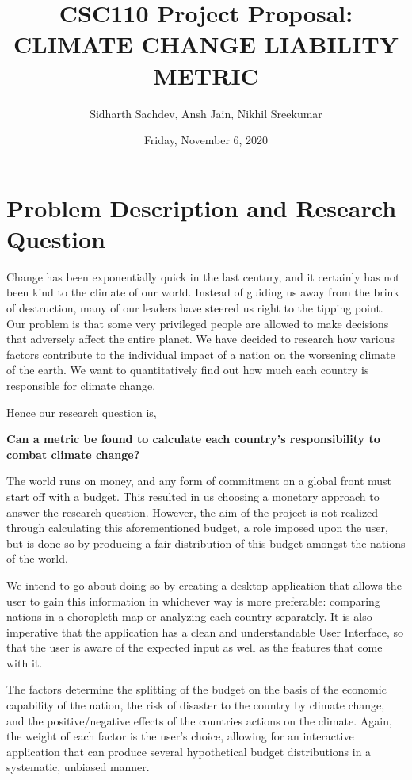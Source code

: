 \documentclass[fontsize=11pt]{article}
\title{CSC110 Project Proposal: CLIMATE CHANGE LIABILITY METRIC}
\author{Sidharth Sachdev, Ansh Jain, Nikhil Sreekumar}
\date{Friday, November 6, 2020}
\begin{document}
\maketitle

\section*{Problem Description and Research Question}

Change has been exponentially quick in the last century, and it certainly has not been kind to the climate of our world.
Instead of guiding us away from the brink of destruction, many of our leaders have steered us right to the tipping point.
Our problem is that some very privileged people are allowed to make decisions that adversely affect the entire planet.
 We have decided to research how various factors contribute to the individual impact of a nation on the worsening climate of the earth.
We want to quantitatively find out how much each country is responsible for climate change.\newline

Hence our research question is,\newline

\textbf{Can a metric be found to calculate each country's responsibility to combat climate change?} \newline

The world runs on money, and any form of commitment on a global front must start off with
a budget.
This resulted in us choosing a monetary approach to answer the research question.
However, the aim of the project is not realized through calculating this aforementioned budget, a role
imposed upon the user, but is done so by producing a fair distribution
of this budget amongst the nations of the world.\newline

We intend to go about doing so by creating a desktop application that allows the user to gain this information in
whichever way is more preferable: comparing nations in a choropleth map or analyzing each country separately.
It is also imperative that the application has a clean and understandable User Interface, so that the user is aware
of the expected input as well as the features that come with it.\newline

The factors determine the splitting of the budget on the basis of the economic capability of the nation, the risk of disaster to the
country by climate change, and the positive/negative effects of the countries actions on the climate.
Again, the weight of each factor is the user's choice, allowing for an interactive application that can produce several
hypothetical budget distributions in a systematic, unbiased manner.
\end{document}

